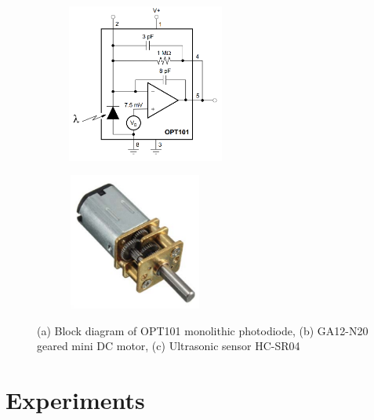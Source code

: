 \documentclass[12pt]{report}
\begin{document}
\begin{justify}
\begin{figure}[H]
\centering
\begin{subfigure}{.4\textwidth}
  \centering
  \includegraphics[height=5.2cm, width=5.2cm, keepaspectratio]{lightsensor.png}
  \caption{}
  \label{fig:sub1}
\end{subfigure}%
\begin{subfigure}{.4\textwidth}
  \centering
  \includegraphics[width= 4.5cm, height=4.5cm, keepaspectratio]{motor.png}
  \caption{}
  \label{fig:sub2}
\end{subfigure}
\begin{subfigure}{.4\textwidth}
  \centering
  \caption{}
  \label{fig:sub3}
\end{subfigure}%
\caption{(a) Block diagram of OPT101 monolithic photodiode, (b) GA12-N20 geared mini DC motor, (c) Ultrasonic sensor HC-SR04}
\label{fig:materials}
\end{figure}



\section{Experiments}


\end{justify}
\end{document}
